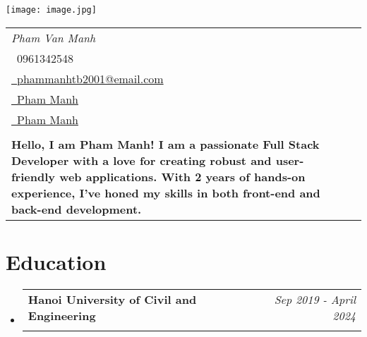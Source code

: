 \documentclass[a4paper,11pt]{article}
\makeatletter
\newcommand{\resumeSubheading}[4]{
\vspace{0.5mm}\item
    \begin{tabular*}{0.98\textwidth}[t]{l@{\extracolsep{\fill}}r}
        \textbf{#1} & \textit{\footnotesize{#4}} \\
        \textit{\footnotesize{#3}} &  \footnotesize{#2}\\
    \end{tabular*}
    \vspace{-2.4mm}
}
\newcommand{\resumeSubHeadingListStart}{\begin{itemize}[leftmargin=*,labelsep=0mm]}
\newcommand{\resumeSubHeadingListEnd}{\end{itemize}\vspace{2mm}}
\newcommand{\name}{Pham Van Manh} %
\newcommand{\phone}{0961342548} %
\newcommand{\emaila}{phammanhtb2001@email.com} %
\newcommand{\headline}{Hello, I am Pham Manh! I am a passionate Full Stack Developer with a love for creating robust and user-friendly web applications. With 2 years of hands-on experience, I’ve honed my skills in both front-end and back-end development.}
\makeatother
\begin{document}
\selectfont


\parbox{2.6cm}{%
\texttt{[image: image.jpg]}
}
\parbox{\dimexpr\linewidth-2.9cm\relax}{
\begin{tabularx}{\linewidth}{L r} \\
  \textit{\Large \name} \\ {\raisebox{0.0\height}{\footnotesize \faPhone}\ \phone}\\
\href{mailto:\emaila}{\raisebox{0.0\height}{\footnotesize \faEnvelope}\ {\emaila}} \\
 \href{https://github.com/manhpvxj}{\raisebox{0.0\height}{\footnotesize \faGithub}\ {Pham Manh}} \\
  \href{https://www.linkedin.com/in/manhpvxj/}{\raisebox{0.0\height}{\footnotesize \faLinkedin}\ {Pham Manh}} \\ \\
  \textbf{\headline}
\end{tabularx}
}





\section{\textbf{Education}}
  \resumeSubHeadingListStart
    \resumeSubheading
      {Hanoi University of Civil and Engineering}{}
      {}{Sep 2019 - April 2024}
  \resumeSubHeadingListEnd
%



\end{document}
